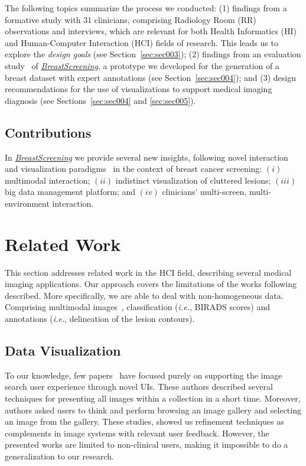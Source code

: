 The following topics summarize the process we conducted:
(1) findings from a formative study with 31 clinicians, comprising Radiology Room (RR) observations and interviews, which are relevant for both Health Informatics (HI) and Human-Computer Interaction (HCI) fields of research.
This leads us to explore the {\it design goals} (see Section~\ref{sec:sec003});
(2) findings from an evaluation study~\cite{https://doi.org/10.13140/rg.2.2.16566.14403/1} of \href{https://breastscreening.github.io/}{{\it BreastScreening}}, a prototype we developed for the generation of a breast dataset with expert annotations (see Section~\ref{sec:sec004}); and
(3) design recommendations for the use of visualizations to support medical imaging diagnosis (see Sections~\ref{sec:sec004} and \ref{sec:sec005}).

\subsection{Contributions}

In \href{https://breastscreening.github.io/}{{\it BreastScreening}} we provide several new insights, following novel interaction and visualization paradigms~\cite{PAULO2019103316} in the context of breast cancer screening:
$(i)$ multimodal interaction;
$(ii)$ indistinct visualization of cluttered lesions;
$(iii)$ big data management platform; and
$(iv)$ clinicians' multi-screen, multi-environment interaction. \section{Related Work}
\label{sec:sec002}

This section addresses related work in the HCI field, describing several medical imaging applications.
Our approach covers the limitations of the works following described.
More specifically, we are able to deal with non-homogeneous data.
Comprising multimodal images~\cite{Zhang_2018_CVPR}, classification ({\it i.e.}, BIRADS scores) and annotations ({\it i.e.}, delineation of the lesion contours).

\subsection{Data Visualization}

To our knowledge, few papers~\cite{10.1145/1133265.1133354, 10.1145/2909132.2909248, 10.1145/3206505.3206602} have focused purely on supporting the image search user experience through novel UIs.
These authors described several techniques for presenting all images within a collection in a short time.
Moreover, authors asked users to think and perform browsing an image gallery and selecting an image from the gallery.
These studies, showed us refinement techniques as complements in image systems with relevant user feedback.
However, the presented works are limited to non-clinical users, making it impossible to do a generalization to our research.

